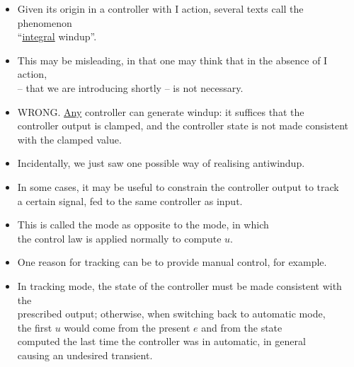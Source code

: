 \begin{frame}
\myPause
 \begin{itemize}[<+-| alert@+>]
 \item Given its origin in a controller with I action, several texts call the phenomenon\\
       ``\underline{integral} windup''.
 \item This may be misleading, in that one may think that in the absence of I action,\\
        -- that we are introducing shortly -- is not necessary.
 \item WRONG. \underline{Any}  controller can generate windup: it suffices that the\\
       controller output is clamped, and the controller state is not made consistent\\
       with the clamped value.
 \item \vfill Incidentally, we just saw one possible way of realising antiwindup. 
 \end{itemize}
\end{frame}

\begin{frame}
\framesubtitleTC{}
\myPause
 \begin{itemize}[<+-| alert@+>]
 \item In some cases, it may be useful to constrain the controller output to track\\
       a certain signal, fed to the same controller as input.
 \item This is called the  mode as opposite to the  mode, in which\\
       the control law is applied normally to compute $u$.
 \item One reason for tracking can be to provide manual control, for example.
 \item In tracking mode, the state of the controller must be made consistent with the\\
       prescribed output; otherwise, when switching back to automatic mode,\\
       the first $u$ would come from the present $e$ and from the state\\
       computed the last time the controller was in automatic, in general\\
       causing an undesired transient. 
 \end{itemize}
\end{frame}

